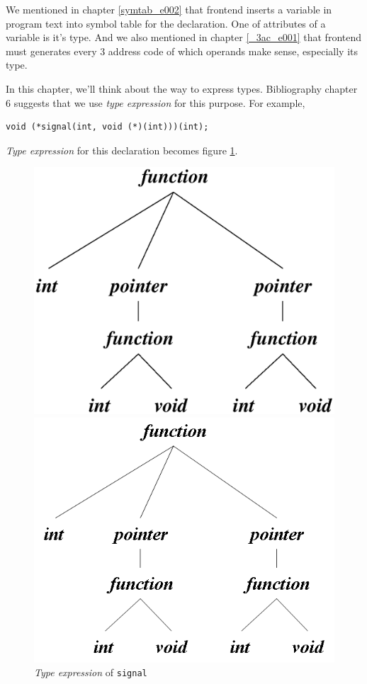 \label{type_e001}
We mentioned in chapter \ref{symtab_e002} that
frontend inserts a variable in program text into symbol table
for the declaration. One of attributes of a variable is it's type.
And we also mentioned in chapter \ref{_3ac_e001} that
frontend must generates every 3 address code of which operands make
sense, especially its type.

In this chapter, we'll think about the way to express types.
Bibliography \cite{doragon} chapter 6 suggests that we
use {\em type expression} for this purpose. For example,
\begin{verbatim}
void (*signal(int, void (*)(int)))(int);
\end{verbatim}
{\em Type expression} for this declaration becomes figure
\ref{type_e006}.

\hspace{0.5cm}
\begin{figure}[htbp]
\begin{center}
\begin{latexonly}
\includegraphics[width=0.5\linewidth,height=0.5\linewidth]{type_expr.eps}
\end{latexonly}
\begin{htmlonly}
\includegraphics{type_expr.png}
\end{htmlonly}
\caption{{\em Type expression} of {\tt{signal}}}
\label{type_e006}
\end{center}
\end{figure}

